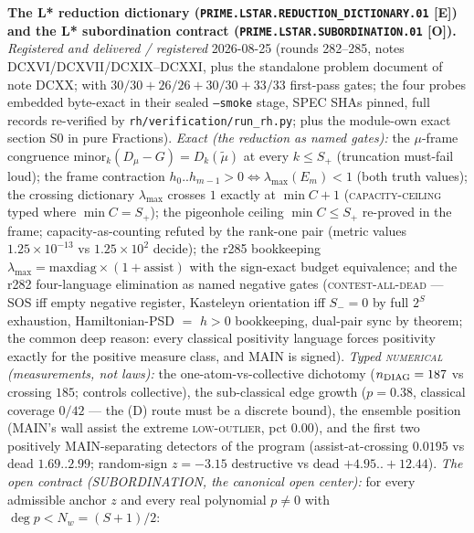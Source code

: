 \par\smallskip\noindent\textbf{The L* reduction dictionary
(\texttt{PRIME.LSTAR.\allowbreak REDUCTION\_DICTIONARY.01} [E])
and the L* subordination contract
(\texttt{PRIME.LSTAR.\allowbreak SUBORDINATION.01} [O]).}
{\sloppy
\emph{Registered and delivered / registered} 2026-08-25 (rounds
282--285, notes DCXVI/DCXVII/DCXIX--DCXXI, plus the standalone
problem document of note DCXX;
 with $30/30 + 26/26
+ 30/30 + 33/33$ first-pass gates; the four probes embedded
byte-exact in their sealed \texttt{--smoke} stage, SPEC SHAs
pinned, full records re-verified by
\texttt{rh/verification/run\_rh.py}; plus the module-own exact
section S0 in pure Fractions).  \emph{Exact (the reduction as
named gates):} the $\mu$-frame congruence
$\mathrm{minor}_k(D_\mu - G) = D_k(\tilde\mu)$ at every $k \le
S_+$ (truncation must-fail loud); the frame contraction
$h_0..h_{m-1} > 0 \iff \lambda_{\max}(E_m) < 1$ (both truth
values); the crossing dictionary $\lambda_{\max}$ crosses $1$
exactly at $\min C + 1$ (\textsc{capacity-ceiling} typed where
$\min C = S_+$); the pigeonhole ceiling $\min C \le S_+$
re-proved in the frame; capacity-as-counting refuted by the
rank-one pair (metric values $1.25\times10^{-13}$ vs
$1.25\times10^{2}$ decide); the r285 bookkeeping
$\lambda_{\max} = \mathrm{maxdiag}\times(1 + \mathrm{assist})$
with the sign-exact budget equivalence; and the r282
four-language elimination as named negative gates
(\textsc{contest-all-dead} --- SOS iff empty negative register,
Kasteleyn orientation iff $S_- = 0$ by full $2^S$ exhaustion,
Hamiltonian-PSD $=$ $h > 0$ bookkeeping, dual-pair sync by
theorem; the common deep reason: every classical positivity
language forces positivity exactly for the positive measure
class, and MAIN is signed).  \emph{Typed \textsc{numerical}
(measurements, not laws):} the one-atom-vs-collective dichotomy
($n_{\rm DIAG} = 187$ vs crossing $185$; controls collective),
the sub-classical edge growth ($p = 0.38$, classical coverage
$0/42$ --- the (D) route must be a discrete bound), the ensemble
position (MAIN's wall assist the extreme \textsc{low-outlier},
pct $0.00$), and the first two positively MAIN-separating
detectors of the program (assist-at-crossing $0.0195$ vs dead
$1.69..2.99$; random-sign $z = -3.15$ destructive vs dead
$+4.95..+12.44$).  \emph{The open contract (SUBORDINATION, the
canonical open center):} for every admissible anchor $z$ and
every real polynomial $p \ne 0$ with $\deg p < N_w = (S+1)/2$:
}
